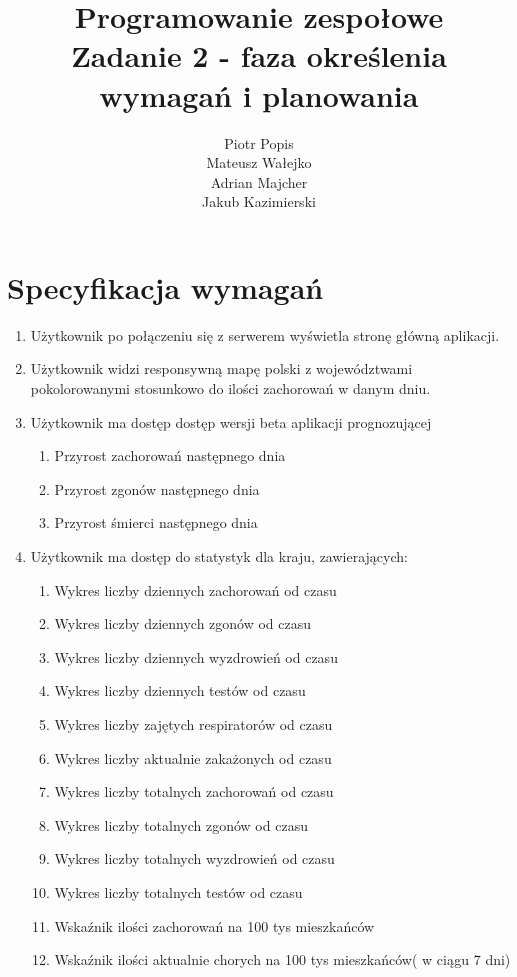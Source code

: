 \documentclass[13pt]{article}
\title{Programowanie zespołowe\\Zadanie 2 - faza określenia wymagań i planowania}
\begin{document}
\author{Piotr Popis\\ Mateusz Wałejko \\ Adrian Majcher\\ Jakub Kazimierski}
\maketitle
\section{Specyfikacja wymagań}
\begin{enumerate}
\item Użytkownik po połączeniu się z serwerem wyświetla stronę główną aplikacji.
\item Użytkownik widzi responsywną mapę polski z  województwami pokolorowanymi stosunkowo do ilości zachorowań w danym dniu.
\item Użytkownik ma dostęp dostęp wersji beta aplikacji prognozującej
\begin{enumerate}
\item Przyrost zachorowań następnego dnia
\item Przyrost zgonów następnego dnia
\item Przyrost śmierci następnego dnia
\end{enumerate}
\item Użytkownik ma dostęp do statystyk dla kraju, zawierających:
\begin{enumerate}
\item Wykres liczby dziennych zachorowań od czasu
\item Wykres liczby dziennych zgonów od czasu
\item Wykres liczby dziennych wyzdrowień od czasu
\item Wykres liczby dziennych testów od czasu
\item Wykres liczby zajętych respiratorów od czasu
\item Wykres liczby aktualnie zakażonych od czasu
\item Wykres liczby totalnych zachorowań od czasu
\item Wykres liczby totalnych zgonów od czasu
\item Wykres liczby totalnych wyzdrowień od czasu
\item Wykres liczby totalnych testów od czasu
\item Wskaźnik ilości zachorowań na 100 tys mieszkańców
\item Wskaźnik ilości aktualnie chorych na 100 tys mieszkańców( w ciągu 7 dni)

\end{enumerate}
\end{enumerate}
\end{document}

